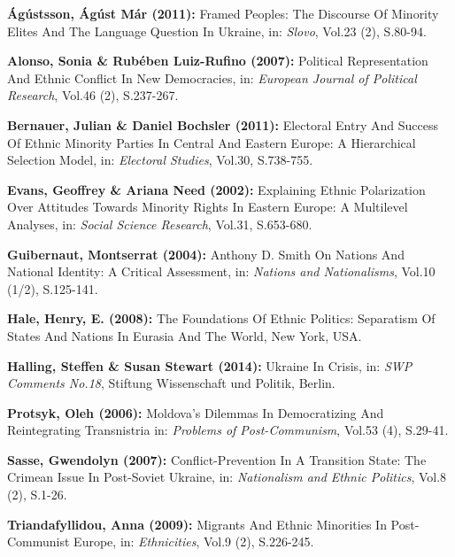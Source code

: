 \begin{compactitem}





\begin{small}



	\item [\Rectsteel] \textbf{\'{A}g\'{u}stsson, \'{A}g\'{u}st M\'{a}r (2011):} Framed Peoples: The Discourse Of Minority Elites And The Language Question In Ukraine, in: \textsl{Slovo}, Vol.23 (2), S.80-94.


	\item [\Rectsteel] \textbf{Alonso, Sonia \& Rub\'{e}ben Luiz-Rufino (2007):} Political Representation And Ethnic Conflict In New Democracies, in: \textsl{European Journal of Political Research}, Vol.46 (2), S.237-267.


	\item [\Rectsteel] \textbf{Bernauer, Julian \& Daniel Bochsler (2011):} Electoral Entry And Success Of Ethnic Minority Parties In Central And Eastern Europe: A Hierarchical Selection Model, in: \textsl{Electoral Studies}, Vol.30, S.738-755.


	\item [\Rectsteel] \textbf{Evans, Geoffrey \& Ariana Need (2002):} Explaining Ethnic Polarization Over Attitudes Towards Minority Rights In Eastern Europe: A Multilevel Analyses, in: \textsl{Social Science Research}, Vol.31, S.653-680.


	\item [\Rectsteel] \textbf{Guibernaut, Montserrat (2004):} Anthony D. Smith On Nations And National Identity: A Critical Assessment, in: \textsl{Nations and Nationalisms}, Vol.10 (1/2), S.125-141.


	\item [\Rectsteel] \textbf{Hale, Henry, E. (2008):} The Foundations Of Ethnic Politics: Separatism Of States And Nations In Eurasia And The World, New York, USA.


	\item [\Rectsteel] \textbf{Halling, Steffen \& Susan Stewart (2014):} Ukraine In Crisis, in: \textsl{SWP Comments No.18}, Stiftung Wissenschaft und Politik, Berlin.


	\item [\Rectsteel] \textbf{Protsyk, Oleh (2006):} Moldova's Dilemmas In Democratizing And Reintegrating Transnistria in: \textsl{Problems of Post-Communism}, Vol.53 (4), S.29-41.


	\item [\Rectsteel] \textbf{Sasse, Gwendolyn (2007):} Conflict-Prevention In A Transition State: The Crimean Issue In Post-Soviet Ukraine, in: \textsl{Nationalism and Ethnic Politics}, Vol.8 (2), S.1-26.


	\item [\Rectsteel] \textbf{Triandafyllidou, Anna (2009):} Migrants And Ethnic Minorities In Post-Communist Europe, in: \textsl{Ethnicities}, Vol.9 (2), S.226-245.


\end{small}



	\end{compactitem}
